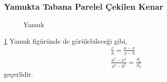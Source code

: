 \subsubsection{Yamukta Tabana Parelel Çekilen Kenar}
\begin{figure}[h!]
    \centering
    \caption{Yamuk}
    \label{fig:trapezoidparellel}
\end{figure}

\ref{fig:trapezoidparellel} Yamuk figüründe de görülebileceği gibi, 
\begin{equation}
  \begin{aligned}
    \frac{c}{d} = \frac{a-x}{x-b} \\
    \frac{a^2 - x^2}{x^2-b^2} = \frac{S_1}{S_2}
  \end{aligned}
\end{equation}
geçerlidir.
